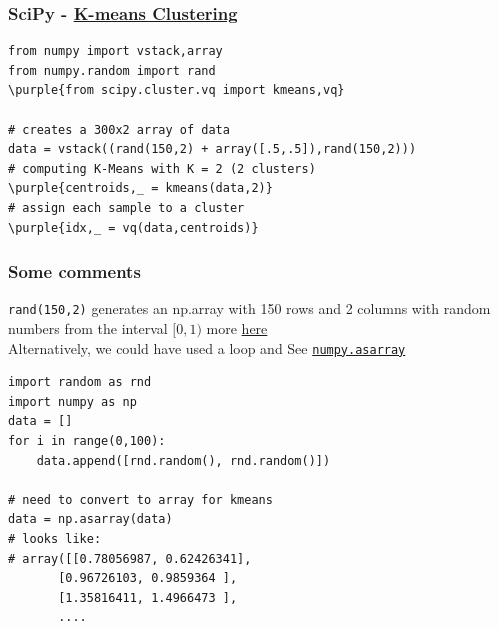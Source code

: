 \documentclass[xcolor=svgnames]{beamer}
\newcommand{\purple}[1]{{\textcolor{purple}{#1}}}
\newcommand{\nl}{\\[1em]}
\newcommand{\ft}[1]{\frametitle{#1}}
\begin{document}
\begin{frame}[fragile]\ft{SciPy - \href{https://glowingpython.blogspot.com/2012/04/k-means-clustering-with-scipy.html}{K-means Clustering}}
\begin{Verbatim}[xleftmargin=.1in, commandchars=\\\{\}] 
from numpy import vstack,array
from numpy.random import rand
\purple{from scipy.cluster.vq import kmeans,vq}

# creates a 300x2 array of data
data = vstack((rand(150,2) + array([.5,.5]),rand(150,2)))
# computing K-Means with K = 2 (2 clusters)
\purple{centroids,_ = kmeans(data,2)}
# assign each sample to a cluster
\purple{idx,_ = vq(data,centroids)}
\end{Verbatim}
\end{frame}

\begin{frame}[fragile]\ft{Some comments}
{\tt rand(150,2)} generates an np.array with 150 rows and 2 columns with random numbers from the interval $[0,1)$ more \href{https://docs.scipy.org/doc/numpy-1.15.1/reference/generated/numpy.random.rand.html}{here}\nl

Alternatively, we could have used a loop and See \href{https://docs.scipy.org/doc/numpy/reference/generated/numpy.asarray.html}{{\tt numpy.asarray}}
\begin{Verbatim}[xleftmargin=0.2in, frame=single]
import random as rnd
import numpy as np
data = []
for i in range(0,100):
    data.append([rnd.random(), rnd.random()])

# need to convert to array for kmeans
data = np.asarray(data) 
# looks like:
# array([[0.78056987, 0.62426341],
       [0.96726103, 0.9859364 ],
       [1.35816411, 1.4966473 ],
       ....
\end{Verbatim}
\end{frame}
\end{document}
